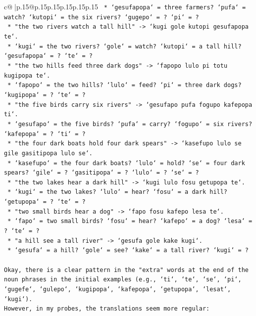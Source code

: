 \documentclass{article}
\begin{document}
{\begin{supertabular}{c@{$\;$}|p{.15\linewidth}@{}p{.15\linewidth}p{.15\linewidth}p{.15\linewidth}p{.15\linewidth}p{.15\linewidth}}
{{{\texttt{            *   `gesufapopa` = three farmers? `pufa` = watch? `kutopi` = the six rivers? `gugepo` = ? `pi` = ?} \\
\texttt{        *   "the two rivers watch a tall hill" {-}> `kugi gole kutopi gesufapopa te`.} \\
\texttt{            *   `kugi` = the two rivers? `gole` = watch? `kutopi` = a tall hill? `gesufapopa` = ? `te` = ?} \\
\texttt{        *   "the two hills feed three dark dogs" {-}> `fapopo lulo pi totu kugipopa te`.} \\
\texttt{            *   `fapopo` = the two hills? `lulo` = feed? `pi` = three dark dogs? `kugipopa` = ? `te` = ?} \\
\texttt{        *   "the five birds carry six rivers" {-}> `gesufapo pufa fogupo kafepopa ti`.} \\
\texttt{            *   `gesufapo` = the five birds? `pufa` = carry? `fogupo` = six rivers? `kafepopa` = ? `ti` = ?} \\
\texttt{        *   "the four dark boats hold four dark spears" {-}> `kasefupo lulo se gile gasitipopa lulo se`.} \\
\texttt{            *   `kasefupo` = the four dark boats? `lulo` = hold? `se` = four dark spears? `gile` = ? `gasitipopa` = ? `lulo` = ? `se` = ?} \\
\texttt{        *   "the two lakes hear a dark hill" {-}> `kugi lulo fosu getupopa te`.} \\
\texttt{            *   `kugi` = the two lakes? `lulo` = hear? `fosu` = a dark hill? `getupopa` = ? `te` = ?} \\
\texttt{        *   "two small birds hear a dog" {-}> `fapo fosu kafepo lesa te`.} \\
\texttt{            *   `fapo` = two small birds? `fosu` = hear? `kafepo` = a dog? `lesa` = ? `te` = ?} \\
\texttt{        *   "a hill see a tall river" {-}> `gesufa gole kake kugi`.} \\
\texttt{            *   `gesufa` = a hill? `gole` = see? `kake` = a tall river? `kugi` = ?} \\
\\ 
\texttt{Okay, there is a clear pattern in the "extra" words at the end of the noun phrases in the initial examples (e.g., `ti`, `te`, `se`, `pi`, `gugefe`, `gulepo`, `kugipopa`, `kafepopa`, `getupopa`, `lesat`, `kugi`).} \\
\texttt{However, in my probes, the translations seem more regular:} \\
}}}
\end{supertabular}}
\end{document}

